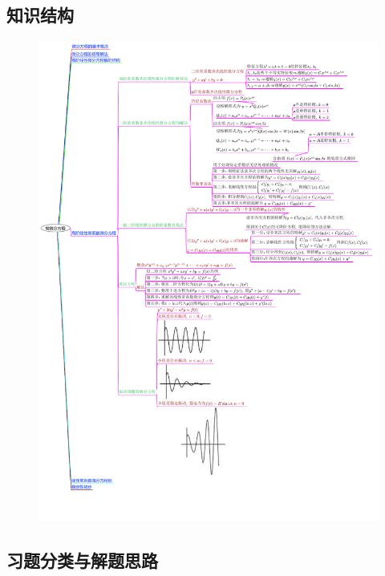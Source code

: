 \documentclass[12pt,UTF8,fleqn]{ctexart}
\begin{document}
\subsection{知识结构}
\begin{figure}[H]
\begin{center}
\includegraphics[height=1\textheight]{20190615-2.pdf}
\end{center}
\end{figure}
\subsection{习题分类与解题思路}
\end{document}
